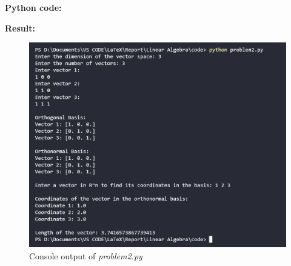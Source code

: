 \clearpage

\textbf{Python code:}


\clearpage

\textbf{Result:}
\begin{figure}[H]
    \centering
    \includegraphics[width=16cm]{graphics/2.png}
    \caption*{Console output of \textit{problem2.py}}
\end{figure}
